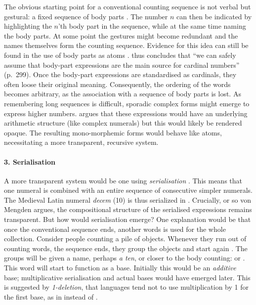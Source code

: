 \documentclass{../src/bcthesispart}
\begin{document}
The obvious starting point for a conventional counting sequence is not verbal but gestural: a fixed sequence of body parts \parencite{VonMengden2008}.
The number $n$ can then be indicated by highlighting the $n$’th body part in the sequence, while at the same time naming the body parts.
At some point the gestures might become redundant and the names themselves form the counting sequence.
Evidence for this idea can still be found in the use of body parts as atoms \parencite[166]{Heine2002}.
\textcite{VonMengden2008} thus concludes that “we can safely assume that body-part expressions are the main source for cardinal numbers” (p.~299).
Once the body-part expressions are standardised as cardinals, they often loose their original meaning.
Consequently, the ordering of the words becomes arbitrary, as the association with a sequence of body parts is lost. 
As remembering long sequences is difficult, sporadic complex forms might emerge to express higher numbers. 
\textcite{VonMengden2008} argues that these expressions would have an underlying arithmetic structure (like complex numerals) but this would likely be rendered opaque. 
The resulting mono-morphemic forms would behave like atoms, necessitating a more transparent, recursive system.




\paragraph{3. Serialisation}

A more transparent system would be one using \emph{serialisation} \textcite{Greenberg1978}.
This means that one numeral is combined with an entire sequence of consecutive simpler numerals. 
The Medieval Latin numeral \emph{decem} (10) is thus serialized in  \parencite[301]{VonMengden2008}.
Crucially, or so von Mengden argues, the compositional structure of the serialised expressions remains transparent.
But how would serialisation emerge? 
One explanation would be that once the conventional sequence ends, another words is used for the whole collection.
Consider people counting a pile of objects.
Whenever they run out of counting words, the sequence ends, they group the objects and start again \parencite{Hurford2007}.
The groups will be given a name, perhaps \emph{a ten}, or closer to the body counting:  or .
This word will start to function as a base.
Initially this would be an \emph{additive} base; multiplicative serialisation and actual bases would have emerged later.
This is suggested by \emph{1-deletion}, that languages tend not to use multiplication by 1 \parencite[54]{Hurford1987} for the first base, as in  instead of . 
\end{document}
